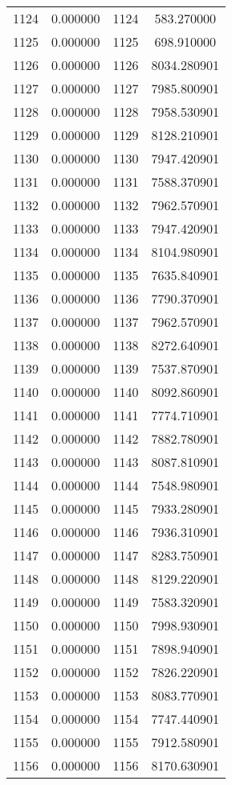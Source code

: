 \documentclass[12pt]{article}
\begin{document}
\begin{longtable}{@{}cccc@{}}
1124 & 0.000000 & 1124 & 583.270000 \\
1125 & 0.000000 & 1125 & 698.910000 \\
1126 & 0.000000 & 1126 & 8034.280901 \\
1127 & 0.000000 & 1127 & 7985.800901 \\
1128 & 0.000000 & 1128 & 7958.530901 \\
1129 & 0.000000 & 1129 & 8128.210901 \\
1130 & 0.000000 & 1130 & 7947.420901 \\
1131 & 0.000000 & 1131 & 7588.370901 \\
1132 & 0.000000 & 1132 & 7962.570901 \\
1133 & 0.000000 & 1133 & 7947.420901 \\
1134 & 0.000000 & 1134 & 8104.980901 \\
1135 & 0.000000 & 1135 & 7635.840901 \\
1136 & 0.000000 & 1136 & 7790.370901 \\
1137 & 0.000000 & 1137 & 7962.570901 \\
1138 & 0.000000 & 1138 & 8272.640901 \\
1139 & 0.000000 & 1139 & 7537.870901 \\
1140 & 0.000000 & 1140 & 8092.860901 \\
1141 & 0.000000 & 1141 & 7774.710901 \\
1142 & 0.000000 & 1142 & 7882.780901 \\
1143 & 0.000000 & 1143 & 8087.810901 \\
1144 & 0.000000 & 1144 & 7548.980901 \\
1145 & 0.000000 & 1145 & 7933.280901 \\
1146 & 0.000000 & 1146 & 7936.310901 \\
1147 & 0.000000 & 1147 & 8283.750901 \\
1148 & 0.000000 & 1148 & 8129.220901 \\
1149 & 0.000000 & 1149 & 7583.320901 \\
1150 & 0.000000 & 1150 & 7998.930901 \\
1151 & 0.000000 & 1151 & 7898.940901 \\
1152 & 0.000000 & 1152 & 7826.220901 \\
1153 & 0.000000 & 1153 & 8083.770901 \\
1154 & 0.000000 & 1154 & 7747.440901 \\
1155 & 0.000000 & 1155 & 7912.580901 \\
1156 & 0.000000 & 1156 & 8170.630901 \\

\end{longtable}
\end{document}
